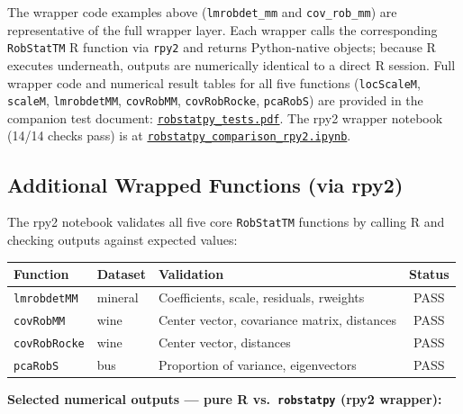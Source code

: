 \documentclass[11pt, a4paper]{article}
\begin{document}
The wrapper code examples above (\texttt{lmrobdet\_mm} and
\texttt{cov\_rob\_mm}) are representative of the full wrapper layer.
Each wrapper calls the corresponding \texttt{RobStatTM} R function
via \texttt{rpy2} and returns Python-native objects; because R
executes underneath, outputs are numerically identical to a direct R
session.
Full wrapper code and numerical result tables for all five functions
(\texttt{locScaleM}, \texttt{scaleM}, \texttt{lmrobdetMM},
\texttt{covRobMM}, \texttt{covRobRocke}, \texttt{pcaRobS}) are
provided in the companion test document:
\href{https://github.com/Aakarsh751/robstattm-pyport-AG-prop/blob/main/docs/gsoc2026_proposal/robstatpy_tests.pdf}%
{\texttt{robstatpy\_tests.pdf}}.
The rpy2 wrapper notebook (14/14 checks pass) is at
\href{https://github.com/Aakarsh751/robstattm-pyport-AG-prop/blob/main/robstattm/python/robstatpy\_comparison\_rpy2.ipynb}%
{\texttt{robstatpy\_comparison\_rpy2.ipynb}}.

\subsection{Additional Wrapped Functions (via rpy2)}

The rpy2 notebook validates all five core \texttt{RobStatTM} functions
by calling R and checking outputs against expected values:

\renewcommand{\arraystretch}{1.2}
\begin{tabularx}{\linewidth}{@{} l l X c @{}}
  \toprule
  \textbf{Function} & \textbf{Dataset} & \textbf{Validation} & \textbf{Status} \\
  \midrule
  \texttt{lmrobdetMM}  & mineral & Coefficients, scale, residuals, rweights & PASS \\
  \texttt{covRobMM}    & wine    & Center vector, covariance matrix, distances & PASS \\
  \texttt{covRobRocke} & wine    & Center vector, distances & PASS \\
  \texttt{pcaRobS}     & bus     & Proportion of variance, eigenvectors & PASS \\
  \bottomrule
\end{tabularx}
\renewcommand{\arraystretch}{1}

\vspace{0.5em}
\noindent\textbf{Selected numerical outputs --- pure R vs.\ \texttt{robstatpy} (rpy2 wrapper):}
\end{document}
